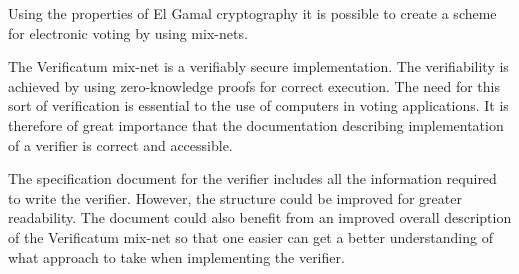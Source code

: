 Using the properties of El Gamal cryptography it is possible to create
a scheme for electronic voting by using mix-nets. 

The Verificatum mix-net is a verifiably secure implementation. The
verifiability is achieved by using zero-knowledge proofs for correct
execution. The need for this sort of verification is essential to the use of
computers in voting applications. It is therefore of great importance
that the documentation describing implementation of a verifier is
correct and accessible.

The specification document for the verifier includes all the
information required to write the verifier. However, the structure
could be improved for greater readability. The document could also
benefit from an improved overall description of the Verificatum
mix-net so that one easier can get a better understanding of what
approach to take when implementing the verifier.

\vspace{22pt}
